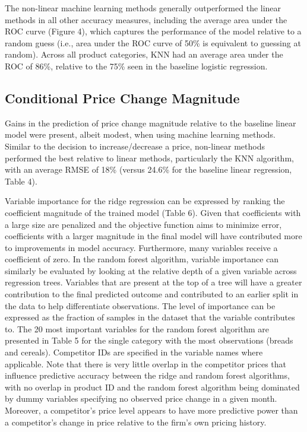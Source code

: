 \documentclass[11pt]{article}
\begin{document}
The non-linear machine learning methods generally outperformed the linear methods in all other accuracy measures, including the average area under the ROC curve (Figure 4), which captures the performance of the model relative to a random guess (i.e., area under the ROC curve of 50\% is equivalent to guessing at random). Across all product categories, KNN had an average area under the ROC of 86\%, relative to the 75\% seen in the baseline logistic regression.     


\subsection{Conditional Price Change Magnitude}

Gains in the prediction of price change magnitude relative to the baseline linear model were present, albeit modest, when using machine learning methods. Similar to the decision to increase/decrease a price, non-linear methods performed the best relative to linear methods, particularly the KNN algorithm, with an average RMSE of 18\% (versus 24.6\% for the baseline linear regression, Table 4).

Variable importance for the ridge regression can be expressed by ranking the coefficient magnitude of the trained model (Table 6). Given that coefficients with a large size are penalized and the objective function aims to minimize error, coefficients with a larger magnitude in the final model will have contributed more to improvements in model accuracy. Furthermore, many variables receive a coefficient of zero. In the random forest algorithm, variable importance can similarly be evaluated by looking at the relative depth of a given variable across regression trees. Variables that are present at the top of a tree will have a greater contribution to the final predicted outcome and contributed to an earlier split in the data to help differentiate observations. The level of importance can be expressed as the fraction of samples in the dataset that the variable contributes to. The 20 most important variables for the random forest algorithm are presented in Table 5 for the single category with the most observations (breads and cereals). Competitor IDs are specified in the variable names where applicable. Note that there is very little overlap in the competitor prices that influence predictive accuracy between the ridge and random forest algorithms, with no overlap in product ID and the random forest algorithm being dominated by dummy variables specifying no observed price change in a given month. Moreover, a competitor's price level appears to have more predictive power than a competitor's change in price relative to the firm's own pricing history. 
\end{document}

